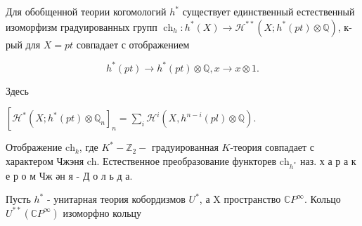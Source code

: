 \documentclass[10pt]{article}
\begin{document}
Для обобщенной теории когомологий $h^{*}$ существует единственный естественный изоморфизм градуированных групп $\operatorname{ch}_{h}: h^{*}(X) \longrightarrow \mathscr{H}^{* *}\left(X ; h^{*}(p t) \otimes \mathbb{Q}\right)$, к-рый для $X=p t$ совпадает с отображением



\[

h^{*}(p t) \rightarrow h^{*}(p t) \otimes \mathbb{Q}, x \rightarrow x \otimes 1 .

\]



Здесь



$\left[\mathscr{H}^{*}\left(X ; h^{*}(p t) \otimes \mathbb{Q}_{n}\right]_{n}=\sum_{i} \mathscr{H}^{i}\left(X, h^{n-i}(p l) \otimes \mathbb{Q}\right)\right.$.



Отображение $\mathrm{ch}_{k}$, где $K^{*}-\mathbb{Z}_{2}-$ градуированная $K$-теория совпадает с характером Чжэня ch. Естественное преобразование функторев $\mathrm{ch}_{h^{*}}$ наз. х а р а к е р о м Чж ән я - Д о л ь д а.



Пусть $h^{*}$ - унитарная теория кобордизмов $U^{*}$, а $\mathrm{X}$ пространство $\mathbb{C} P^{\infty}$. Кольцо $U^{* *}\left(\mathbb{C} P^{\infty}\right)$ изоморфно кольцу
\end{document}

